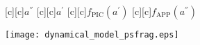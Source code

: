 \documentclass{article}
\begin{document}
\begin{figure}[htb]
  \begin{center}


        [c][c]{$a^{''}$}
        [c][c]{$a^{'}$}
        [c][c]{$f_{\mathrm{PIC}}(a^{'})$}
        [c][c]{\hspace{0.5mm}$f_{\mathrm{APP}}(a^{''})$}

    \texttt{[image: dynamical\_model\_psfrag.eps]}
    \end{center}
\end{figure}
\end{document}

